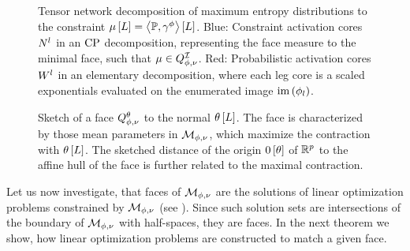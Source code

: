 \begin{figure}
    \begin{center}
        
    \end{center}
    \caption{
        Tensor network decomposition of maximum entropy distributions to the constraint $\mu\left[L\right]=\left\langle \mathbb{P},\gamma^{\phi}\right\rangle \left[ L \right]$.
        Blue: Constraint activation cores $N^{l}$ in an $\mathrm{CP}$ decomposition, representing the face measure to the minimal face, such that $\mu\in Q^{\mathcal{I}}_{\phi,\nu}$.
        Red: Probabilistic activation cores $W^{l}$ in an elementary decomposition, where each leg core is a scaled exponentials evaluated on the enumerated image $\mathrm{im}\left(\phi_{l}\right)$.
    }\label{fig:maxEntropyActcore}
\end{figure}




\begin{figure}[t!]
    \begin{center}
        
    \end{center}
    \caption{Sketch of a face $Q^{\theta}_{\phi,\nu}$ to the normal $\theta\left[L\right]$.
    The face is characterized by those mean parameters in $\mathcal{M}_{\phi,\nu}$, which maximize the contraction with $\theta\left[L\right]$.
    The sketched distance of the origin $0\left[\theta\right]$ of $\mathbb{R}^{p}$ to the affine hull of the face is further related to the maximal contraction.
    }\label{fig:meansetSketchFace}
\end{figure}


Let us now investigate, that faces of $\mathcal{M}_{\phi,\nu}$ are the solutions of linear optimization problems constrained by $\mathcal{M}_{\phi,\nu}$ (see ).
Since such solution sets are intersections of the boundary of $\mathcal{M}_{\phi,\nu}$ with half-spaces, they are faces.
In the next theorem we show, how linear optimization problems are constructed to match a given face.

